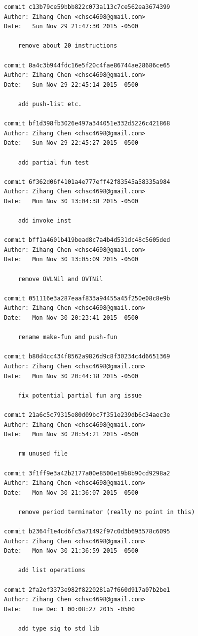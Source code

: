 \documentclass{report}
\begin{document}
\begin{appendices}
\begin{verbatim}
commit c13b79ce59bbb822c073a113c7ce562ea3674399
Author: Zihang Chen <chsc4698@gmail.com>
Date:   Sun Nov 29 21:47:30 2015 -0500

    remove about 20 instructions

commit 8a4c3b944fdc16e5f20c4fae86744ae28686ce65
Author: Zihang Chen <chsc4698@gmail.com>
Date:   Sun Nov 29 22:45:14 2015 -0500

    add push-list etc.

commit bf1d398fb3026e497a344051e332d5226c421868
Author: Zihang Chen <chsc4698@gmail.com>
Date:   Sun Nov 29 22:45:27 2015 -0500

    add partial fun test

commit 6f362d06f4101a4e777eff42f83545a58335a984
Author: Zihang Chen <chsc4698@gmail.com>
Date:   Mon Nov 30 13:04:38 2015 -0500

    add invoke inst

commit bff1a4601b419bead8c7a4b4d531dc48c5605ded
Author: Zihang Chen <chsc4698@gmail.com>
Date:   Mon Nov 30 13:05:09 2015 -0500

    remove OVLNil and OVTNil

commit 051116e3a287eaaf833a94455a45f250e08c8e9b
Author: Zihang Chen <chsc4698@gmail.com>
Date:   Mon Nov 30 20:23:41 2015 -0500

    rename make-fun and push-fun

commit b80d4cc434f8562a9826d9c8f30234c4d6651369
Author: Zihang Chen <chsc4698@gmail.com>
Date:   Mon Nov 30 20:44:18 2015 -0500

    fix potential partial fun arg issue

commit 21a6c5c79315e80d09bc7f351e239db6c34aec3e
Author: Zihang Chen <chsc4698@gmail.com>
Date:   Mon Nov 30 20:54:21 2015 -0500

    rm unused file

commit 3f1ff9e3a42b2177a00e8500e19b8b90cd9298a2
Author: Zihang Chen <chsc4698@gmail.com>
Date:   Mon Nov 30 21:36:07 2015 -0500

    remove period terminator (really no point in this)

commit b2364f1e4cd6fc5a71492f97c0d3b693578c6095
Author: Zihang Chen <chsc4698@gmail.com>
Date:   Mon Nov 30 21:36:59 2015 -0500

    add list operations

commit 2fa2ef3373e982f8220281a7f660d917a07b2be1
Author: Zihang Chen <chsc4698@gmail.com>
Date:   Tue Dec 1 00:08:27 2015 -0500

    add type sig to std lib


\end{verbatim}
\end{appendices}
\end{document}
